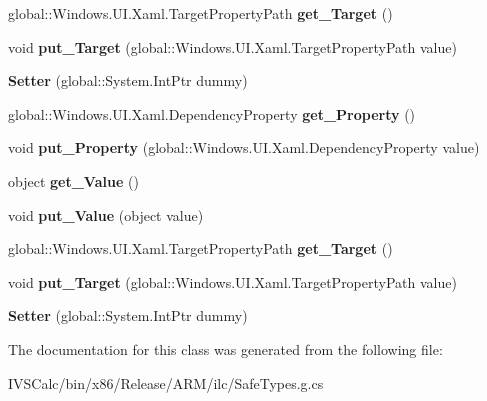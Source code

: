 \begin{DoxyCompactItemize}
global\+::\+Windows.\+U\+I.\+Xaml.\+Target\+Property\+Path {\bfseries get\+\_\+\+Target} ()
\item 
\mbox{\label{class_windows_1_1_u_i_1_1_xaml_1_1_setter_a625ef62aa1e630e8cfe82e287e278cb2}} 
void {\bfseries put\+\_\+\+Target} (global\+::\+Windows.\+U\+I.\+Xaml.\+Target\+Property\+Path value)
\item 
\mbox{\label{class_windows_1_1_u_i_1_1_xaml_1_1_setter_a8afe01be4ca04014f678f20627344902}} 
{\bfseries Setter} (global\+::\+System.\+Int\+Ptr dummy)
\item 
\mbox{\label{class_windows_1_1_u_i_1_1_xaml_1_1_setter_a686887dcaf21b9a12cd491564e78b429}} 
global\+::\+Windows.\+U\+I.\+Xaml.\+Dependency\+Property {\bfseries get\+\_\+\+Property} ()
\item 
\mbox{\label{class_windows_1_1_u_i_1_1_xaml_1_1_setter_ab6f14c994bdff627cc05c2de84c4e918}} 
void {\bfseries put\+\_\+\+Property} (global\+::\+Windows.\+U\+I.\+Xaml.\+Dependency\+Property value)
\item 
\mbox{\label{class_windows_1_1_u_i_1_1_xaml_1_1_setter_a36e13b544319d51446f95fa1d4f99345}} 
object {\bfseries get\+\_\+\+Value} ()
\item 
\mbox{\label{class_windows_1_1_u_i_1_1_xaml_1_1_setter_aa1b1137b1463b4c0fcf2698f1ef38332}} 
void {\bfseries put\+\_\+\+Value} (object value)
\item 
\mbox{\label{class_windows_1_1_u_i_1_1_xaml_1_1_setter_a354e09225c55d9bc08796200969e6dbc}} 
global\+::\+Windows.\+U\+I.\+Xaml.\+Target\+Property\+Path {\bfseries get\+\_\+\+Target} ()
\item 
\mbox{\label{class_windows_1_1_u_i_1_1_xaml_1_1_setter_a625ef62aa1e630e8cfe82e287e278cb2}} 
void {\bfseries put\+\_\+\+Target} (global\+::\+Windows.\+U\+I.\+Xaml.\+Target\+Property\+Path value)
\item 
\mbox{\label{class_windows_1_1_u_i_1_1_xaml_1_1_setter_a8afe01be4ca04014f678f20627344902}} 
{\bfseries Setter} (global\+::\+System.\+Int\+Ptr dummy)
\end{DoxyCompactItemize}


The documentation for this class was generated from the following file\+:\begin{DoxyCompactItemize}
\item 
I\+V\+S\+Calc/bin/x86/\+Release/\+A\+R\+M/ilc/Safe\+Types.\+g.\+cs\end{DoxyCompactItemize}
